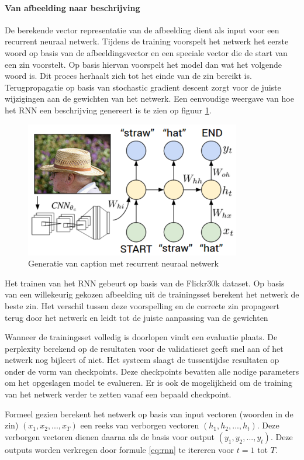 \paragraph{Van afbeelding naar beschrijving}
De berekende vector representatie van de afbeelding dient als input voor een recurrent neuraal netwerk. Tijdens de training voorspelt het netwerk het eerste woord op basis van de afbeeldingsvector en een speciale vector die de start van een zin voorstelt. Op basis hiervan voorspelt het model dan wat het volgende woord is. Dit proces herhaalt zich tot het einde van de zin bereikt is. Terugpropagatie op basis van stochastic gradient descent zorgt voor de juiste wijzigingen aan de gewichten van het netwerk. Een eenvoudige weergave van hoe het RNN een beschrijving genereert is te zien op figuur \ref{fig:rnntraining}.

\begin{figure}[tb]
    \centering
    \includegraphics[width=0.5\linewidth]{Images/karpathy.PNG}
    \caption{Generatie van caption met recurrent neuraal netwerk}
\label{fig:rnntraining}
\end{figure}

Het trainen van het RNN gebeurt op basis van de Flickr30k dataset. 
Op basis van een willekeurig gekozen afbeelding uit de trainingsset berekent het netwerk de beste zin. Het verschil tussen deze voorspelling en de correcte zin propageert terug door het netwerk en leidt tot de juiste aanpassing van de gewichten

Wanneer de trainingsset volledig is doorlopen vindt een evaluatie plaats. De perplexity berekend op de resultaten voor de validatieset geeft snel aan of het netwerk nog bijleert of niet. Het systeem slaagt de tussentijdse resultaten op onder de vorm van checkpoints. Deze checkpoints bevatten alle nodige parameters om het opgeslagen model te evalueren. Er is ook de mogelijkheid om de training van het netwerk verder te zetten vanaf een bepaald checkpoint. 

Formeel gezien berekent het netwerk op basis van input vectoren (woorden in de zin) $(x_1,x_2,...,x_T)$ een reeks van verborgen vectoren $(h_1,h_2,...,h_t)$. Deze verborgen vectoren dienen daarna als de basis voor output $(y_1,y_2,...,y_t)$. Deze outputs worden verkregen door formule \eqref{eq:rnn} te itereren voor $t = 1$ tot $T$.

